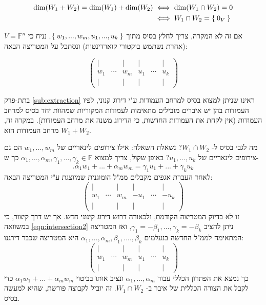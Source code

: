 \documentclass[12pt]{report}
\theoremstyle{plain}
\theoremstyle{definition}
\newcommand{\F}{\mathbb{F}}
\newcommand{\0}{\mathbf{0}}
\begin{document}
$$
\begin{aligned}
\dim(W_1+W_2)=\dim(W_1)+\dim(W_2) &\iff \dim(W_1\cap W_2)=0 \\
&\iff W_1\cap W_2= \Set{0_V}
\end{aligned}
$$

אם זה לא המקרה, צריך לחלץ בסיס מתוך 
$\Set{w_1,...,w_m,u_1,...,u_k}$.
נניח כי
$V=\F^n$
(אחרת נשתמש בוקטורי קוארדינטות)
ונסתכל על המטריצה הבאה:

$$
\begin{pmatrix}
\mid &        & \mid & \mid &        & \mid \\
w_1  & \cdots & w_m  & u_1  & \cdots & u_k \\
\mid &        & \mid & \mid &        & \mid
\end{pmatrix}
$$

בתת-פרק 
\ref{sub:extraction}
ראינו שניתן למצוא בסיס למרחב העמודות ע"י דירוג קנוני, לפיו העמודות בהן יש איברים מובילים מתאימות לעמודות המקוריות שמהוות יחד בסיס למרחב העמודות (אין לקחת את העמודות החדשות, כי הדירוג משנה את מרחב העמודות).
במקרה זה, מרחב העמודות הוא 
$W_1+W_2$.

מה לגבי בסיס ל-
$W_1\cap W_2$?
נשאלת השאלה: אילו צירופים לינאריים של
$w_1,...,w_m$
הם גם צירופים לינאריים של
$u_1,...,u_k$?
באופן שקול, צריך למצוא 
$\alpha_1,...,\alpha_m,\gamma_1,...,\gamma_k\in\F$
כך ש-
\begin{equation}\label{eqn:intersection2}
.\alpha_1 w_1+...+\alpha_m w_m=\gamma_1 u_1+...+\gamma_k u_k
\end{equation}
לאחר העברת אגפים מקבלים ממ"ל הומוגנית שמיוצגת ע"י המטריצה הבאה:
$$
\begin{pmatrix}
\mid &        & \mid & \mid &        & \mid \\
w_1  & \cdots & w_m  & -u_1  & \cdots & -u_k \\
\mid &        & \mid & \mid &        & \mid
\end{pmatrix}
$$
זו לא בדיוק המטריצה הקודמת, ולכאורה דרוש דירוג קינוני חדש. אך יש דרך קיצור, כי במשוואה
\ref{eqn:intersection2}
ניתן להציב
$\gamma_1=-\beta_1,...,\gamma_k=-\beta_k$,
ואז המטריצה המתאימה לממ"ל החדשה בנעלמים
$\alpha_1,...,\alpha_m,\beta_1,....,\beta_k$
היא המטריצה שכבר דירגנו:
$$
\begin{pmatrix}
\mid &        & \mid & \mid &        & \mid \\
w_1  & \cdots & w_m  & u_1  & \cdots & u_k \\
\mid &        & \mid & \mid &        & \mid
\end{pmatrix}
$$
כך נמצא את הפתרון הכללי עבור
$\alpha_1,...,\alpha_m$
ונציב אותו בביטוי
$\alpha_1w_1+...+\alpha_mw_m$
כדי לקבל את הצורה הכללית של איבר ב-
$W_1\cap W_2$.
זה יוביל לקבוצה פורשת, שהיא למעשה בסיס.
\end{document}
